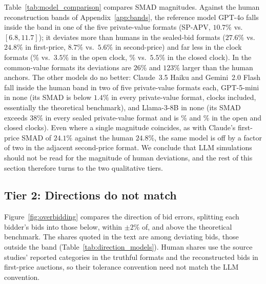 \documentclass[acmsmall,screen,review]{acmart}
\newcommand{\rev}[1]{{\color{blue}#1}}
\newcommand{\rev}[1]{#1}
\begin{document}
Table~\ref{tab:model_comparison} compares SMAD magnitudes. Against the human reconstruction bands of Appendix~\ref{app:bands}, the reference model GPT-4o falls inside the band in one of the five private-value formats (SP-APV, $10.7\%$ vs.\ $[6.8, 11.7]$); it deviates more than humans in the sealed-bid formats ($27.6\%$ vs.\ $24.8\%$ in first-price, $8.7\%$ vs.\ $5.6\%$ in second-price) and far less in the clock formats (\rev{\SmadACGpt\%} vs.\ $3.5\%$ in the open clock, \rev{\SmadACBGpt\%} vs.\ \rev{$5.5\%$} in the closed clock). In the common-value formats its deviations are $26\%$ and $123\%$ larger than the human anchors. The other models do no better: Claude~3.5 Haiku and Gemini~2.0 Flash fall inside the human band in two of five private-value formats each, GPT-5-mini in none (its SMAD is below $1.4\%$ in every private-value format\rev{, clocks included}, essentially the theoretical benchmark), and Llama-3-8B in none (its SMAD exceeds $38\%$ \rev{in every sealed private-value format and is \SmadACLlama\% and \SmadACBLlama\% in the open and closed clocks}). Even where a single magnitude coincides, as with Claude's first-price SMAD of $24.1\%$ against the human $24.8\%$, the same model is off by a factor of two in the adjacent second-price format. We conclude that LLM simulations should not be read for the magnitude of human deviations, and the rest of this section therefore turns to the two qualitative tiers.

\subsection{\texorpdfstring{Tier 2: Directions do not match}{Tier 2: Directions do not match}}\label{sec:tier_directions}

Figure~\ref{fig:overbidding} compares the direction of bid errors\rev{, splitting each bidder's bids into those below, within $\pm 2\%$ of, and above the theoretical benchmark. The shares quoted in the text are among deviating bids, those outside the band (Table~\ref{tab:direction_models}).} Human shares use the source studies' reported categories in the truthful formats and the reconstructed bids in first-price auctions, so their tolerance convention need not match the LLM convention.
\end{document}

